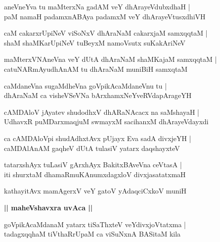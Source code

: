 \documentclass[twoside,12pt,openright]{book}
\newcounter{shloka}[chapter]
\def\uvaca#1{\centerline{{\large\textbf{#1}}}}
\begin{document}
\begin{shloka}%
aneVneYva tu maMterxNa gadAM veY dhArayeVdubxdhaH |\\
paM namaH padamxnABAya padamxM veY dhArayeVtusxdhiVH 
\end{shloka}

\begin{shloka}%
caM cakarxrUpiNeV viSoNxV dhAraNaM cakarxjaM samxqqtaM |\\
shaM shaMKarUpiNeV tuBeyxM namoVsutx suKakAriNeV 
\end{shloka}

\begin{shloka}%
maMterxVNAneVna veY dUtA dhAraNaM shaMKajaM samxqqtaM |\\
catuNARmAyudhAnAM tu dhAraNaM muniBiH samxqtaM 
\end{shloka}

\begin{shloka}%
caMdaneVna sugaMdheVna goVpikAcaMdaneVnu tu |\\
dhAraNaM ca visheVSeVNa bArxhamxNeYveRVdapArageYH
\end{shloka}

\begin{shloka}%
cAMDAloV jAyatev shudodhxV dhARaNAcacx na saMshayaH |\\
UdhavxR puMDarxmaqjuM swmayxM sacihanxM dhArayeVdayxdi
\end{shloka}

\begin{shloka}%
ca cAMDAloVpi shudAdhxtAvx pUjayx Eva sadA divxjeYH |\\
caMDAlAnAM gaqheV dUtA tulasiV yatarx daqshayxteV 
\end{shloka}

\begin{shloka}%
tatarxshAyx tuLasiV gArxhAyx BakitxBAveVna ceVtasA |\\
iti shurxtaM dhamaRmuKAnumxdagxloV divxjasatatxmaH 
\end{shloka}

\begin{shloka}%
kathayitAvx mamAgerxV veY gatoV yAdaqciCxkoV muniH
\end{shloka}

\uvaca{|| maheVshavxra uvAca ||}

\begin{shloka}%
goVpikAcaMdanaM yatarx tiSaThxteV veYdivxjoVtatxma |\\
tadagxqqhaM tiVthaRrUpaM ca viSuNxnA BASitaM kila 
\end{shloka}
\end{document}
